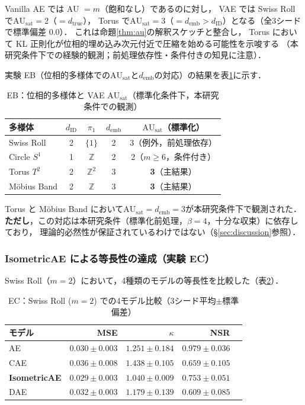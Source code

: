 \documentclass[11pt,a4paper]{jsarticle}
\newcommand{\dID}{d_{\mathrm{ID}}}
\newcommand{\dtrue}{d_{\mathrm{true}}}
\newcommand{\kap}{\kappa}
\newcommand{\AUsat}{\mathrm{AU}_{\mathrm{sat}}}
\newcommand{\demb}{d_{\mathrm{emb}}}
\begin{document}
Vanilla AE では AU $= m$（飽和なし）であるのに対し，
VAE では Swiss Roll で$\AUsat = 2$（$= \dtrue$），
Torus で$\AUsat = 3$（$= \demb > \dID$）となる（全3シードで標準偏差 0.0）．
これは命題\ref{thm:au}の解釈スケッチと整合し，
Torus において KL 正則化が位相的埋め込み次元付近で圧縮を始める可能性を示唆する
（本研究条件下での経験的観測；前処理依存性・条件付きの知見に注意）．

実験 EB（位相的多様体での$\AUsat$と$\demb$の対応）の結果を表\ref{tab:eb_summary}に示す．

\begin{table}[H]
\centering
\caption{EB：位相的多様体と VAE $\AUsat$（標準化条件下，本研究条件での観測）}
\label{tab:eb_summary}
\small
\begin{tabular}{lcccc}
\toprule
多様体 & $\dID$ & $\pi_1$ & $\demb$ & $\AUsat$（標準化） \\
\midrule
Swiss Roll   & 2 & $\{1\}$        & 2 & 3（例外，前処理依存）\\
Circle $S^1$ & 1 & $\mathbb{Z}$   & 2 & 2（$m \geq 6$，条件付き）\\
Torus $T^2$  & 2 & $\mathbb{Z}^2$ & 3 & \textbf{3}（主結果）\\
Möbius Band  & 2 & $\mathbb{Z}$   & 3 & \textbf{3}（主結果）\\
\bottomrule
\end{tabular}
\end{table}

Torus と Möbius Band において$\AUsat = \demb = 3$が本研究条件下で観測された．
\textbf{ただし}，この対応は本研究条件（標準化前処理，$\beta = 4$，十分な収束）に依存しており，
理論的必然性が保証されているわけではない（§\ref{sec:discussion}参照）．

\subsubsection{IsometricAE による等長性の達成（実験 EC）}

Swiss Roll（$m = 2$）において，4種類のモデルの等長性を比較した（表\ref{tab:ec}）．

\begin{table}[H]
\centering
\caption{EC：Swiss Roll ($m=2$) での4モデル比較（3シード平均$\pm$標準偏差）}
\label{tab:ec}
\small
\begin{tabular}{lrrrr}
\toprule
モデル & MSE & $\kap$ & NSR \\
\midrule
AE & $0.030\pm0.003$ & $1.251\pm0.184$ & $0.979\pm0.036$ \\
CAE & $0.036\pm0.008$ & $1.438\pm0.105$ & $0.659\pm0.105$ \\
\textbf{IsometricAE} & $\boldsymbol{0.029\pm0.003}$ & $\boldsymbol{1.040\pm0.009}$ & $0.753\pm0.051$ \\
DAE & $0.032\pm0.003$ & $1.179\pm0.139$ & $0.609\pm0.085$ \\
\bottomrule
\end{tabular}
\end{table}
\end{document}
